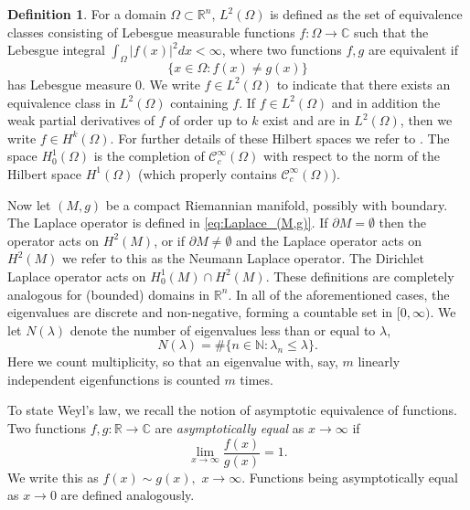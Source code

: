 \documentclass{amsart}
\theoremstyle{definition}
\newtheorem{definition}[theorem]{Definition}
\newcommand*{\R}{\mathbb{R}}
\newcommand*{\N}{\mathbb{N}}
\newcommand*{\C}{\mathbb{C}}
\newcommand{\pa}{\partial}
\begin{document}
\begin{definition} \label{def:L2_Hk}
For a domain $\Omega \subset \R^n$, $L^2(\Omega)$ is defined as the set of equivalence classes consisting of Lebesgue measurable functions $f : \Omega \to \C$ such that the Lebesgue integral $\int_\Omega |f(x)|^2dx < \infty$, where two functions $f,g$ are equivalent if
\begin{equation*}
\{x \in \Omega : f(x) \neq g(x)\}
\end{equation*}
has Lebesgue measure 0. We write $f \in L^2(\Omega)$ to indicate that there exists an equivalence class in $L^2(\Omega)$ containing $f$. If $f \in L^2(\Omega)$ and in addition the weak partial derivatives of $f$ of order up to $k$ exist and are in $ L^2(\Omega)$, then we write $f \in H^k(\Omega)$. For further details of these Hilbert spaces we refer to \cite[p. 51]{folland1999real}. The space $H^1 _0(\Omega)$ is the completion of $\mathscr C^\infty _c (\Omega) $ with respect to the norm of the Hilbert space $H^1 (\Omega)$ (which properly contains $\mathscr C^\infty _c (\Omega)$). 
\end{definition}


Now let $(M,g)$ be a compact Riemannian manifold, possibly with boundary.  The Laplace operator is defined in \eqref{eq:Laplace_(M,g)}.  If $\pa M = \emptyset$ then the operator acts on $ H^2(M)$, or if $\pa M \neq \emptyset$ and the Laplace operator acts on $H^2(M)$ we refer to this as the Neumann Laplace operator.  The Dirichlet Laplace operator acts on $ H^1 _0 (M) \cap H^2(M)$.  These definitions are completely analogous for (bounded) domains in $\R^n$.  In all of the aforementioned cases, the eigenvalues are discrete and non-negative, forming a countable set in $[0, \infty)$.   We let $N(\lambda)$ denote the number of eigenvalues less than or equal to $\lambda$, 
    \begin{equation} \label{eq:N_lambda}
        N(\lambda) = \#\{n \in \N : \lambda_n \leq \lambda\}.
    \end{equation} 
Here we count multiplicity, so that an eigenvalue with, say, $m$ linearly independent eigenfunctions is counted $m$ times. 

To state Weyl's law, we recall the notion of asymptotic equivalence of functions.  Two functions $f,g : \R \to \C$ are \textit{asymptotically equal} as $x \to \infty$ if
    \begin{equation*}
        \lim_{x \to \infty} \frac{f(x)}{g(x)} = 1.
    \end{equation*}
We write this as $f(x) \sim g(x), \,\,x \to \infty$. Functions being asymptotically equal as $x \to 0$ are defined analogously. 
\end{document}
